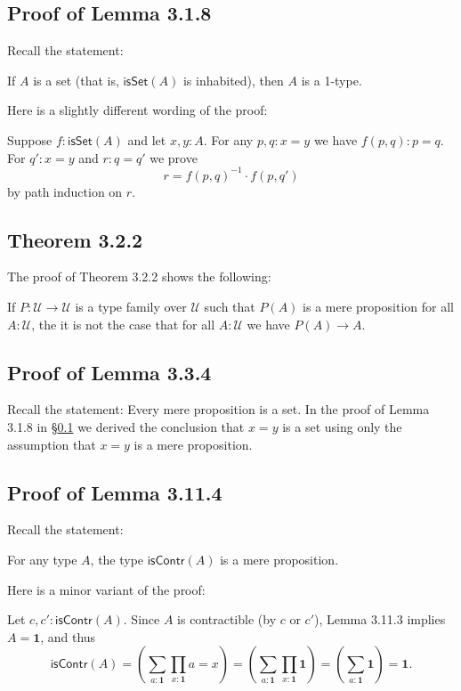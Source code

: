 \documentclass[12pt]{article}
\newcommand{\mbf}{\mathbf}
\newcommand{\msf}{\mathsf}
\newcommand{\U}{\mathcal U}
\begin{document}
\subsection{Proof of Lemma 3.1.8}\label{318}

Recall the statement: 

If $A$ is a set (that is, $\msf{isSet}(A)$ is inhabited), then $A$ is a 1-type. 

Here is a slightly different wording of the proof:

Suppose $f:\msf{isSet}(A)$ and let $x,y:A$. For any $p,q:x=y$ we have $f(p,q):p=q$. For $q':x=y$ and $r:q=q'$ we prove 
$$
r=f(p,q)^{-1}\cdot f(p,q')
$$ 
by path induction on $r$.


\subsection{Theorem 3.2.2}

The proof of Theorem 3.2.2 shows the following:

If $P:\U\to\U$ is a type family over $\U$ such that $P(A)$ is a mere proposition for all $A:\U$, the it is not the case that for all $A:\U$ we have $P(A)\to A$.


\subsection{Proof of Lemma 3.3.4}

Recall the statement: Every mere proposition is a set. In the proof of Lemma 3.1.8 in \S\ref{318} we derived the conclusion that $x=y$ is a set using only the assumption that $x=y$ is a mere proposition.


\subsection{Proof of Lemma 3.11.4} 

Recall the statement: 

For any type $A$, the type $\msf{isContr}(A)$ is a mere proposition.

Here is a minor variant of the proof:

Let $c,c':\msf{isContr}(A)$. Since $A$ is contractible (by $c$ or $c'$), Lemma 3.11.3 implies $A=\mbf1$, and thus 
$$
\msf{isContr}(A)=\left(\sum_{a:\mbf1}\prod_{x:\mbf1}a=x\right)=\left(\sum_{a:\mbf1}\prod_{x:\mbf1}\mbf1\right)=\left(\sum_{a:\mbf1}\mbf1\right)=\mbf1.
$$
\end{document}
